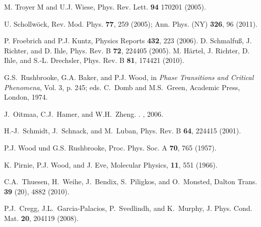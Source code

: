 \documentclass[aps,twocolumn,groupedaddress]{revtex4}
\begin{document}
\begin{thebibliography}{10}

 M. Troyer M and U.J. Wiese,
Phys. Rev. Lett. {\bf 94} 170201 (2005).

U. Schollw\"ock, Rev. Mod. Phys. {\bf 77}, 259 (2005); Ann. Phys. (NY) {\bf 326}, 96
(2011).

P. Froebrich  and P.J. Kuntz, Physics Reports {\bf 432}, 223
(2006).
 D. Schmalfu{\ss}, J. Richter, and D. Ihle,
      Phys. Rev. B {\bf 72}, 224405 (2005).
 M. H\"{a}rtel, J. Richter, D. Ihle, and  S.-L. Drechsler,
      Phys. Rev. B {\bf 81},  174421 (2010).


 G.S.~Rushbrooke, G.A. Baker, and P.J. Wood, in
{\em Phase Transitions and Critical Phenomena}, Vol. 3, p. 245; eds.
C.~Domb and M.S.~Green, Academic Press, London, 1974.


J.~Oitmaa, C.J.~Hamer, and W.H.~Zheng.
.
, {2006}.

H.-J.~Schmidt, J.~Schnack, and M.~Luban,
 Phys. Rev. B {\bf 64}, 224415 (2001).

P.J. Wood und G.S. Rushbrooke,
Proc. Phys. Soc. A {\bf 70}, 765 (1957).

K. Pirnie, P.J. Wood, and J. Eve,
Molecular Physics, {\bf 11}, 551 (1966).

C.A.~Thuesen, H.~Weihe, J.~Bendix, S.~Piligkos, and O.~Monsted,
Dalton Trans. {\bf 39} (20), 4882 (2010).

P.J.~Cregg, J.L.~Garcia-Palacios, P.~Svedlindh, and K.~Murphy,
J. Phys. Cond. Mat. {\bf 20}, 204119 (2008).


\end{thebibliography}
\end{document}

